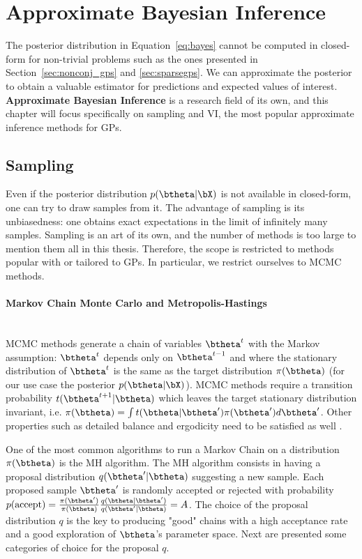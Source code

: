 \section{Approximate Bayesian Inference}
\label{sec:approx_inf}

The posterior distribution in Equation~\eqref{eq:bayes} cannot be computed in closed-form for non-trivial problems such as the ones presented in Section~\ref{sec:nonconj_gps} and \ref{sec:sparsegps}.
We can approximate the posterior to obtain a valuable estimator for predictions and expected values of interest.
\textbf{Approximate Bayesian Inference} is a research field of its own, and this chapter will focus specifically on sampling and \acl{VI}, the most popular approximate inference methods for \acp{GP}.

\subsection{Sampling}

Even if the posterior distribution $p(\btheta|\bX)$ is not available in closed-form, one can try to draw samples from it.
The advantage of sampling is its unbiasedness: one obtains exact expectations in the limit of infinitely many samples.
Sampling is an art of its own, and the number of methods is too large to mention them all in this thesis.
Therefore, the scope is restricted to methods popular with or tailored to \acp{GP}.
In particular, we restrict ourselves to \ac{MCMC} methods.

\paragraph{Markov Chain Monte Carlo and Metropolis-Hastings}\mbox{}\\
\acf{MCMC} methods generate a chain of variables $\btheta^t$ with the Markov assumption: $\btheta^t$ depends only on $\btheta^{t-1}$ and where the stationary distribution of $\btheta^t$ is the same as the target distribution $\pi(\btheta)$ (for our use case the posterior $p(\btheta|\bX)$).
\ac{MCMC} methods require a transition probability $t(\btheta^{t+1}|\btheta)$ which leaves the target stationary distribution invariant, i.e. $\pi(\btheta) = \int t(\btheta|\btheta')\pi(\btheta')d\btheta'$.
Other properties such as detailed balance and ergodicity need to be satisfied as well \cite{brooks2011handbook, o2004kendall}.

One of the most common algorithms to run a Markov Chain on a distribution $\pi(\btheta)$ is the \acf{MH} algorithm.
The \ac{MH} algorithm consists in having a proposal distribution $q(\btheta'|\btheta)$ suggesting a new sample.
Each proposed sample $\btheta'$ is randomly accepted or rejected with probability $p(\text{accept}) = \frac{\pi(\btheta')}{\pi(\btheta)}\frac{q(\btheta|\btheta')}{q(\btheta'|\btheta)} = A$.
The choice of the proposal distribution $q$ is the key to producing "good" chains with a high acceptance rate and a good exploration of $\btheta$'s parameter space.
Next are presented some categories of choice for the proposal $q$.


